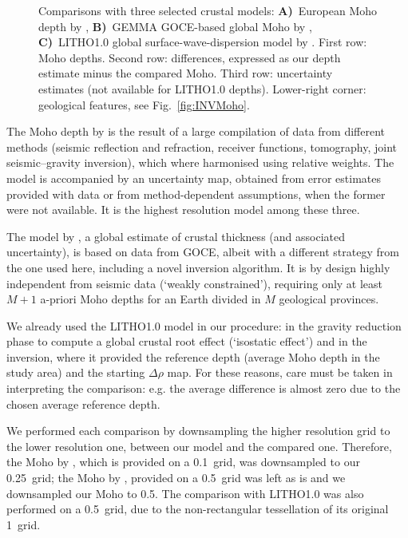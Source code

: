 {\begin{figure}
	\begin{adjustbox}{center}
	\end{adjustbox}
	\caption{Comparisons with three selected crustal models: \textbf{A)}~European Moho depth by \textcite{Grad2009}, \textbf{B)}~GEMMA GOCE-based global Moho by \textcite{Reguzzoni2015}, \textbf{C)}~{LITHO1.0} global surface-wave-dispersion model by \textcite{Pasyanos2014}.
	First row: Moho depths. Second row: differences, expressed as our depth estimate minus the compared Moho. Third row: uncertainty estimates (not available for {LITHO1.0} depths).
	Lower-right corner: geological features, see Fig.~\ref{fig:INVMoho}.}
	\label{fig:MohoComparisons}
\end{figure}

The Moho depth by \textcite{Grad2009} is the result of a large compilation of data from different methods (seismic reflection and refraction, receiver functions, tomography, joint seismic--gravity inversion), which where harmonised using relative weights.
The model is accompanied by an uncertainty map, obtained from error estimates provided with data or from method-dependent assumptions, when the former were not available.
It is the highest resolution model among these three.

The model by \textcite{Reguzzoni2015}, a global estimate of crustal thickness (and associated uncertainty), is based on data from GOCE, albeit with a different strategy from the one used here, including a novel inversion algorithm.
It is by design highly independent from seismic data (`weakly constrained'), requiring only at least $M+1$ a-priori Moho depths for an Earth divided in $M$ geological provinces.

We already used the {LITHO1.0} \parencite{Pasyanos2014} model in our procedure: in the gravity reduction phase to compute a global crustal root effect (`isostatic effect') and in the inversion, where it provided the reference depth (average Moho depth in the study area) and the starting $\Delta \rho$ map.
For these reasons, care must be taken in interpreting the comparison: e.g. the average difference is almost zero due to the chosen average reference depth.

We performed each comparison by downsampling the higher resolution grid to the lower resolution one, between our model and the compared one.
Therefore, the Moho by \textcite{Grad2009}, which is provided on a 0.1\textdegree~grid, was downsampled to our 0.25\textdegree~grid; the Moho by \textcite{Reguzzoni2015}, provided on a 0.5\textdegree~grid was left as is and we downsampled our Moho to 0.5\textdegree.
The comparison with LITHO1.0 was also performed on a 0.5\textdegree~grid, due to the non-rectangular tessellation of its original 1\textdegree~grid.

}

